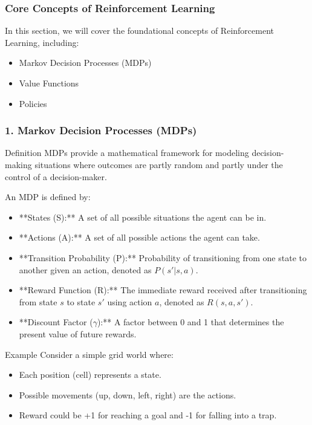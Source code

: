 \documentclass[aspectratio=169]{beamer}
\begin{document}
\begin{frame}[fragile]
    \frametitle{Core Concepts of Reinforcement Learning}
    In this section, we will cover the foundational concepts of Reinforcement Learning, including:
    \begin{itemize}
        \item Markov Decision Processes (MDPs)
        \item Value Functions
        \item Policies
    \end{itemize}
\end{frame}

\begin{frame}[fragile]
    \frametitle{1. Markov Decision Processes (MDPs)}
    \begin{block}{Definition}
        MDPs provide a mathematical framework for modeling decision-making situations where outcomes are partly random and partly under the control of a decision-maker.
    \end{block}
    An MDP is defined by:
    \begin{itemize}
        \item **States (S):** A set of all possible situations the agent can be in.
        \item **Actions (A):** A set of all possible actions the agent can take.
        \item **Transition Probability (P):** Probability of transitioning from one state to another given an action, denoted as \(P(s'|s, a)\).
        \item **Reward Function (R):** The immediate reward received after transitioning from state \(s\) to state \(s'\) using action \(a\), denoted as \(R(s, a, s')\).
        \item **Discount Factor ($\gamma$):** A factor between 0 and 1 that determines the present value of future rewards.
    \end{itemize}
    \begin{block}{Example}
        Consider a simple grid world where:
        \begin{itemize}
            \item Each position (cell) represents a state.
            \item Possible movements (up, down, left, right) are the actions.
            \item Reward could be +1 for reaching a goal and -1 for falling into a trap.
        \end{itemize}
    \end{block}
\end{frame}
\end{document}
